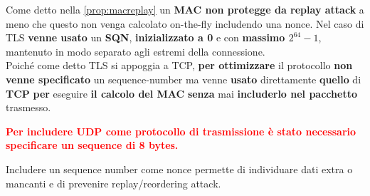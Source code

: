 \begin{note}
Come detto nella \cref{prop:macreplay} un \textbf{MAC non protegge da replay attack} a meno che questo non venga calcolato on-the-fly includendo una nonce. Nel caso di TLS \textbf{venne usato} un \textbf{SQN}, \textbf{inizializzato a 0} e con \textbf{massimo $2^{64}-1$}, mantenuto in modo separato agli estremi della connessione.\\
Poiché come detto TLS si appoggia a TCP, \textbf{per ottimizzare} il protocollo \textbf{non venne specificato} un sequence-number ma venne \textbf{usato} direttamente \textbf{quello} di \textbf{TCP} \textbf{per} eseguire \textbf{il calcolo del MAC} \textbf{senza} mai \textbf{includerlo nel pacchetto} trasmesso. 
\end{note}
\begin{note}
\textbf{\textcolor{red}{Per includere UDP come protocollo di trasmissione è stato necessario specificare un sequence di 8 bytes.}}
\end{note}
\begin{remark}
Includere un sequence number come nonce permette di individuare dati extra o mancanti e di prevenire replay/reordering attack.
\end{remark}

